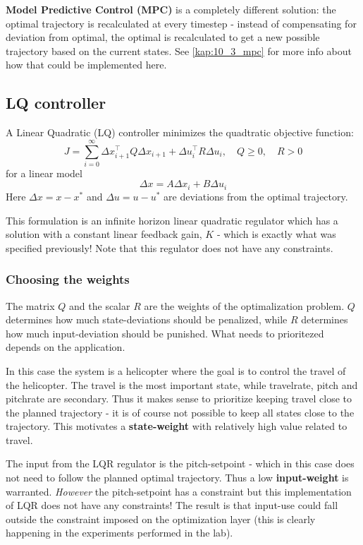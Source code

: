 \documentclass[../main.tex]{subfiles}
\begin{document}
\textbf{Model Predictive Control (MPC)} is a completely different solution: the optimal trajectory is recalculated at every timestep - instead of compensating for deviation from optimal, the optimal is recalculated to get a new possible trajectory based on the current states. See \cref{kap:10_3_mpc} for more info about how that could be implemented here.

\subsection{LQ controller} \label{kap:task_10_3_LQ_controller}
A Linear Quadratic (LQ) controller minimizes the quadtratic objective function:
\begin{equation}
    J = \sum^\infty_{i=0} \Delta x_{i+1}^\top Q \Delta x_{i+1} + \Delta u_i^\top R \Delta u_i, \quad Q \ge0, \quad R > 0
\end{equation}
for a linear model
\begin{equation}\label{eq:lab3_lin_model}
	\Delta x=A\Delta x_i + B \Delta u_i
\end{equation}
Here $ \Delta x = x - x^*$ and $\Delta u = u - u^*$ are deviations from the optimal trajectory.

This formulation is an infinite horizon linear quadratic regulator which has a solution with a constant linear feedback gain, $K$ - which is exactly what was specified previously! Note that this regulator does not have any constraints.

\subsubsection{Choosing the weights}
The matrix $Q$ and the scalar $R$ are the weights of the optimalization problem. $Q$ determines how much state-deviations should be penalized, while $R$ determines how much input-deviation should be punished. What needs to prioritezed depends on the application.

In this case the system is a helicopter where the goal is to control the travel of the helicopter. The travel is the most important state, while travelrate, pitch and pitchrate are secondary. Thus it makes sense to prioritize keeping travel close to the planned trajectory - it is of course not possible to keep all states close to the trajectory. This motivates a \textbf{state-weight} with relatively high value related to travel.

The input from the LQR regulator is the pitch-setpoint - which in this case does not need to follow the planned optimal trajectory. Thus a low \textbf{input-weight} is warranted. \textit{However} the pitch-setpoint has a constraint but this implementation of LQR does not have any constraints! The result is that input-use could fall outside the constraint imposed on the optimization layer (this is clearly happening in the experiments performed in the lab).
\end{document}
